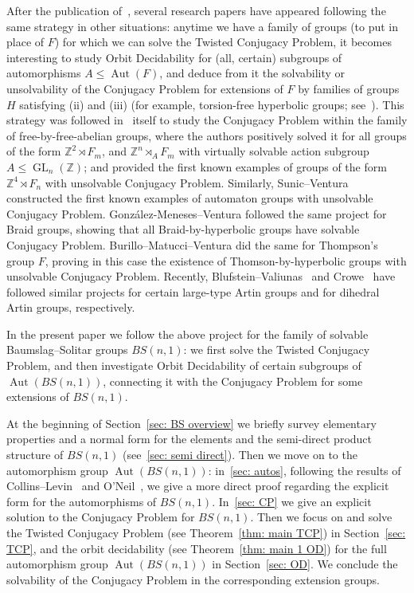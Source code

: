 \documentclass[english]{amsart}
\theoremstyle{definition}
\newcommand\ZZ{\mathbb{Z}}
\newcommand{\GL}{\operatorname{GL}}
\newcommand{\Aut}{\operatorname{Aut}}
\begin{document}
After the publication of~\cite{BMV}, several research papers have appeared following the same strategy in other situations: anytime we have a family of groups (to put in place of $F$) for which we can solve the Twisted Conjugacy Problem, it becomes interesting to study Orbit Decidability for (all, certain) subgroups of automorphisms $A\leqslant \Aut(F)$, and deduce from it the solvability or unsolvability of the Conjugacy Problem for extensions of $F$ by families of groups $H$ satisfying (ii) and (iii) (for example, torsion-free hyperbolic groups; see~\cite{BMV}). This strategy was followed in~\cite{BMV} itself to study the Conjugacy Problem within the family of free-by-free-abelian groups, where the authors positively solved it for all groups of the form $\ZZ^2 \rtimes F_m$, and $\ZZ^n \rtimes_A F_m$ with virtually solvable action subgroup $A\leqslant \GL_n(\ZZ)$; and provided the first known examples of groups of the form $\ZZ^4 \rtimes F_n$ with unsolvable Conjugacy Problem. Similarly, Sunic--Ventura \cite{SV} constructed the first known examples of automaton groups with unsolvable Conjugacy Problem. Gonz\'alez-Meneses--Ventura \cite{GM-V} followed the same project for Braid groups, showing that all Braid-by-hyperbolic groups have solvable Conjugacy Problem. Burillo--Matucci--Ventura \cite{BuMV} did the same for Thompson's group $F$, proving in this case the existence of Thomson-by-hyperbolic groups with unsolvable Conjugacy Problem. Recently, Blufstein--Valiunas~\cite{BV} and Crowe~\cite{Cr, Cr2} have followed similar projects for certain large-type Artin groups and for dihedral Artin groups, respectively. 

In the present paper we follow the above project for the family of solvable Baumslag--Solitar groups $BS(n,1)$: we first solve the Twisted Conjugacy Problem, and then investigate Orbit Decidability of certain subgroups of $\Aut(BS(n,1))$, connecting it with the Conjugacy Problem for some extensions of $BS(n,1)$.


At the beginning of Section~\ref{sec: BS overview} we briefly survey elementary properties and a normal form for the elements and the semi-direct product structure of $BS(n,1)$ (see~\ref{sec: semi direct}). Then we move on to the automorphism group $\Aut(BS(n,1))$: in~\ref{sec: autos}, following the results of Collins--Levin~\cite{CoLe} and O'Neil~\cite{N}, we give a more direct proof regarding the explicit form for the automorphisms of $BS(n,1)$. In~\ref{sec: CP} we give an explicit solution to the Conjugacy Problem for $BS(n,1)$. Then we focus on and solve the Twisted Conjugacy Problem (see Theorem~\ref{thm: main TCP}) in Section~\ref{sec: TCP}, and the orbit decidability (see Theorem~\ref{thm: main 1 OD}) for the full automorphism group $\Aut(BS(n,1))$ in Section~\ref{sec: OD}. We conclude the solvability of the Conjugacy Problem in the corresponding extension groups. 
\end{document}
